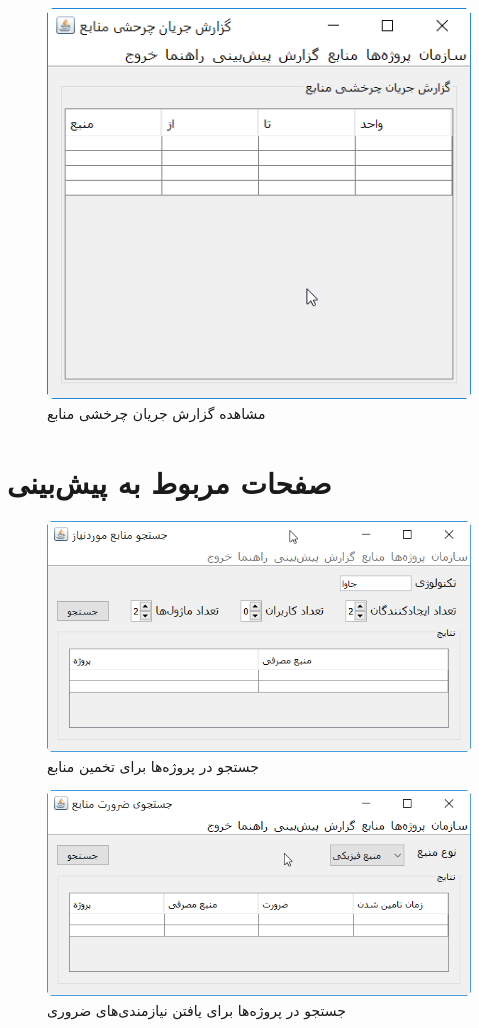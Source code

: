 \begin{figure}[H]
	\centering
	\includegraphics[scale=0.8]{img/prot/ViewFlowResourceReport}
	\caption{مشاهده گزارش جریان چرخشی منابع }
\end{figure}


\section{صفحات مربوط به پیش‌بینی}
\begin{figure}[H]
	\centering
	\includegraphics[scale=0.8]{img/prot/EstimateRequirements}
	\caption{جستجو در پروژه‌ها برای تخمین منابع }
\end{figure}
\begin{figure}[H]
	\centering
	\includegraphics[scale=0.8]{img/prot/EstimateResources}
	\caption{جستجو در پروژه‌ها برای یافتن نیازمندی‌های ضروری }
\end{figure}